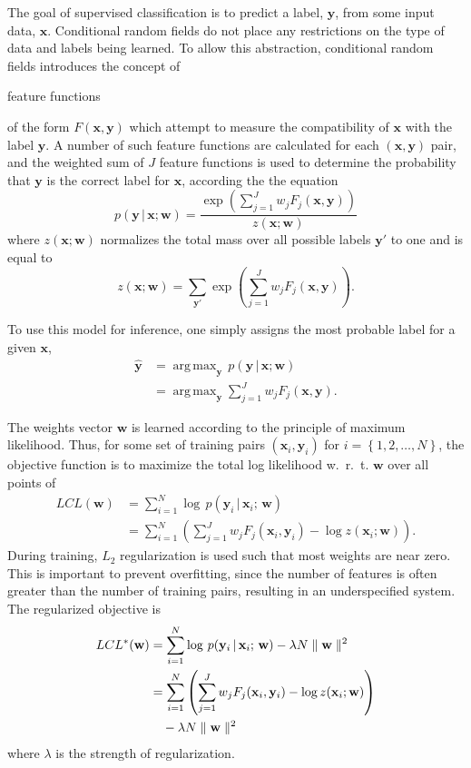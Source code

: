 \documentclass[10pt,twocolumn,letterpaper]{article}
\newcommand{\x}{\mathbf{x}}
\newcommand{\y}{\mathbf{y}}
\newcommand{\w}{\mathbf{w}}
\DeclareMathOperator*{\argmax}{arg\,max}
\begin{document}
The goal of supervised classification is to predict a label, $\y$, from some input data, $\x$. Conditional random fields do not place any restrictions on the type of data and labels being learned. To allow this abstraction, conditional random fields introduces the concept of \begin{em}feature functions\end{em} of the form $F(\x,\y)$ which attempt to measure the compatibility of $\x$ with the label $\y$. A number of such feature functions are calculated for each $(\x,\y)$ pair, and the weighted sum of $J$ feature functions is used to determine the probability that $\y$ is the correct label for $\x$, according the the equation
\begin{equation}
	p(\y\,|\,\x;\w) = \frac{\exp \left( \sum_{j=1}^J w_j F_j (\x,\y) \right)}{z(\x;\w)}
\end{equation}
where $z(\x;\w)$ normalizes the total mass over all possible labels $\y'$ to one and is equal to
\begin{equation}
	z(\x;\w) = \sum_{\y'} \exp \left( \sum_{j=1}^J w_j F_j (\x,\y) \right).
\end{equation}

To use this model for inference, one simply assigns the most probable label for a given $\x$,
\begin{align}
	\hat{\y} & =\argmax_{\y} \, p(\y\,|\,\x;\w) \\
		&= \argmax_{\y} \sum_{j=1}^J w_j F_j(\x,\y).
\end{align}

The weights vector $\w$ is learned according to the principle of maximum likelihood. Thus, for some set of training pairs $(\x_i,\y_i)$ for $i=\left\{1,2,\dots,N\right\}$, the objective function is to maximize the total log likelihood w.~r.~t. $\w$ over all points of
\begin{align}
	LCL(\w) &= \sum_{i=1}^N \log\,p(\y_i\,|\,\x_i ;\,\w) \\
		&= \sum_{i=1}^N \left( \sum_{j=1}^J w_j F_j (\x_i,\y_i) - \log z(\x_i;\w) \right).
\end{align}
During training, $L_2$ regularization is used such that most weights are near zero. This is important to prevent overfitting, since the number of features is often greater than the number of training pairs, resulting in an underspecified system. The regularized objective is
\begin{align}
	LCL^*(\w) &= \sum_{i=1}^N \log\,p(\y_i\,|\,\x_i ;\,\w) - \lambda N\parallel \w \parallel^2 \\
		&= \sum_{i=1}^N \left( \sum_{j=1}^J w_j F_j (\x_i,\y_i)  - \log z(\x_i;\w) \right) \notag \\
		&\hspace{1 em}  - \lambda N\parallel \w \parallel^2
\end{align}
where $\lambda$ is the strength of regularization.
\end{document}

